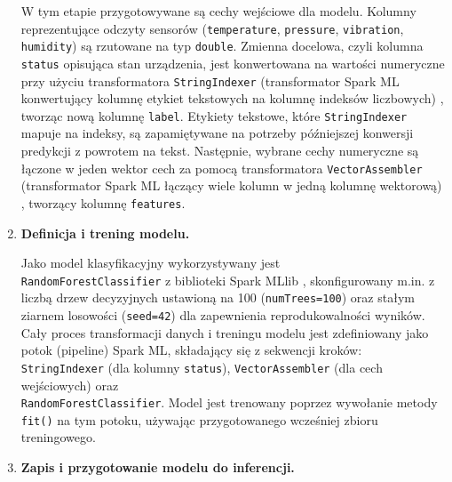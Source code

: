 \begin{enumerate}
W tym etapie przygotowywane są cechy wejściowe dla modelu. Kolumny reprezentujące odczyty sensorów (\texttt{temperature}, \texttt{pressure}, \texttt{vibration}, \texttt{humidity}) są rzutowane na typ \texttt{double}. Zmienna docelowa, czyli kolumna \texttt{status} opisująca stan urządzenia, jest konwertowana na wartości numeryczne przy użyciu transformatora \texttt{StringIndexer} (transformator Spark ML konwertujący kolumnę etykiet tekstowych na kolumnę indeksów liczbowych) \cite{spark_string_indexer}, tworząc nową kolumnę \texttt{label}. Etykiety tekstowe, które \texttt{StringIndexer} mapuje na indeksy, są zapamiętywane na potrzeby późniejszej konwersji predykcji z powrotem na tekst. Następnie, wybrane cechy numeryczne są łączone w jeden wektor cech za pomocą transformatora \texttt{VectorAssembler} (transformator Spark ML łączący wiele kolumn w jedną kolumnę wektorową) \cite{spark_vector_assember} , tworzący kolumnę \texttt{features}.

    \item \textbf{Definicja i trening modelu.}

Jako model klasyfikacyjny wykorzystywany jest \\ \texttt{RandomForestClassifier} z biblioteki Spark MLlib \cite{spark_mllib_reference}, skonfigurowany m.in. z liczbą drzew decyzyjnych ustawioną na 100 (\texttt{numTrees=100}) oraz stałym ziarnem losowości (\texttt{seed=42}) dla zapewnienia reprodukowalności wyników. Cały proces transformacji danych i treningu modelu jest zdefiniowany jako potok (pipeline) Spark ML, składający się z sekwencji kroków: \texttt{StringIndexer} (dla kolumny \texttt{status}), \texttt{VectorAssembler} (dla cech wejściowych) oraz \\ \texttt{RandomForestClassifier}. Model jest trenowany poprzez wywołanie metody \texttt{fit()} na tym potoku, używając przygotowanego wcześniej zbioru treningowego.

    \item \textbf{Zapis i przygotowanie modelu do inferencji.}


\end{enumerate}
